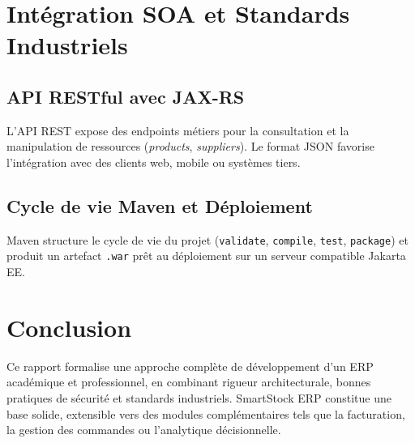 \documentclass[12pt,a4paper]{report}
\begin{document}
\chapter{Intégration SOA et Standards Industriels}

\section{API RESTful avec JAX-RS}
L'API REST expose des endpoints métiers pour la consultation et la manipulation de ressources (\textit{products}, \textit{suppliers}). Le format JSON favorise l'intégration avec des clients web, mobile ou systèmes tiers.

\section{Cycle de vie Maven et Déploiement}
Maven structure le cycle de vie du projet (\texttt{validate}, \texttt{compile}, \texttt{test}, \texttt{package}) et produit un artefact \texttt{.war} prêt au déploiement sur un serveur compatible Jakarta EE.

\begin{center}
\end{center}

\chapter*{Conclusion}
Ce rapport formalise une approche complète de développement d'un ERP académique et professionnel, en combinant rigueur architecturale, bonnes pratiques de sécurité et standards industriels. SmartStock ERP constitue une base solide, extensible vers des modules complémentaires tels que la facturation, la gestion des commandes ou l'analytique décisionnelle.
\end{document}
